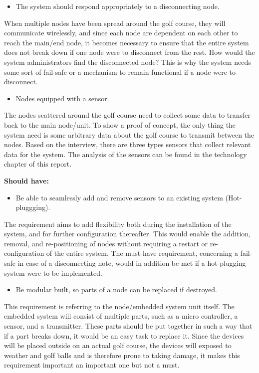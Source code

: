 \begin{itemize}
\item The system should respond appropriately to a disconnecting node.
\end{itemize}
When multiple nodes have been spread around the golf course, they will communicate wirelessly, and since each node are dependent on each other to reach the main/end node, it becomes necessary to ensure that the entire system does not break down if one node were to disconnect from the rest. How would the system administrators find the disconnected node? This is why the system needs some sort of fail-safe or a mechanism to remain functional if a node were to disconnect.


\begin{itemize}
\item Nodes equipped with a sensor.
\end{itemize}
The nodes scattered around the golf course need to collect some data to transfer back to the main node/unit. To show a proof of concept, the only thing the system need is some arbitrary data about the golf course to transmit between the nodes. Based on the interview, there are three types sensors that collect relevant data for the system. The analysis of the sensors can be found in the technology chapter of this report.


\textbf{Should have:}
\begin{itemize}
\item Be able to seamlessly add and remove sensors to an existing system (Hot-pluggging).
\end{itemize}
The requirement aims to add flexibility both during the installation of the system, and for further configuration thereafter. This would enable the addition, removal, and re-positioning of nodes without requiring a restart or re-configuration of the entire system. The must-have requirement, concerning a fail-safe in case of a disconnecting note, would in addition be met if a hot-plugging system were to be implemented.


\begin{itemize}
\item Be modular built, so parts of a node can be replaced if destroyed.
\end{itemize}
This requirement is referring to the node/embedded system unit itself. The embedded system will consist of multiple parts, such as a micro controller, a sensor, and a transmitter. These parts should be put together in such a way that if a part breaks down, it would be an easy task to replace it. Since the devices will be placed outside on an actual golf course, the devices will exposed to weather and golf balls and is therefore prone to taking damage, it makes this requirement important an important one but not a must.


